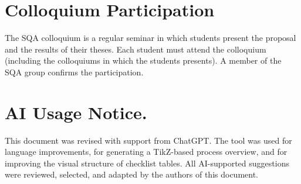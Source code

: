 \documentclass[11pt,a4paper]{article}
\begin{document}
\section{Colloquium Participation}
The SQA colloquium is a regular seminar in which students present the proposal and the results of their theses.
Each student must attend the colloquium  (including the colloquiums in which the students presents).
A member of the SQA group confirms the participation.

\section*{AI Usage Notice.}
This document was revised with support from ChatGPT. The tool was used for language improvements, for generating a TikZ-based process overview, and for improving the visual structure of checklist tables. All AI-supported suggestions were reviewed, selected, and adapted by the authors of this document.
\end{document}

